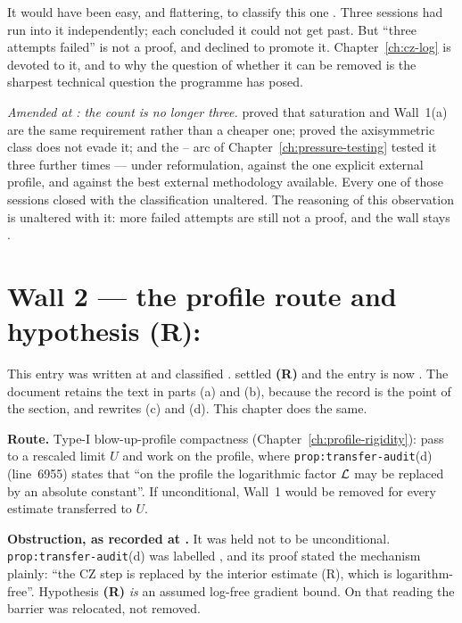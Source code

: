 \begin{obsv}
\label{obs:wall1-open}
It would have been easy, and flattering, to classify this one \IMPOSSIBLE{}.
Three sessions had run into it independently; each concluded it could not get
past. But ``three attempts failed'' is not a proof, and  declined to
promote it. Chapter~\ref{ch:cz-log} is devoted to it, and to why the question
of whether it can be removed is the sharpest technical question the programme
has posed.

\smallskip
\emph{Amended at : the count is no longer three.}  proved that
saturation and Wall~1(a) are the same requirement rather than a cheaper one;
 proved the axisymmetric class does not evade it; and the
-- arc of Chapter~\ref{ch:pressure-testing} tested it three
further times --- under reformulation, against the one explicit external
profile, and against the best external methodology available. Every one of
those sessions closed with the classification unaltered. The reasoning of this
observation is unaltered with it: more failed attempts are still not a proof,
and the wall stays \OPEN{}.
\end{obsv}

\section{Wall 2 --- the profile route and hypothesis (R): \texorpdfstring{\WITHDRAWN}{withdrawn}}
\label{sec:wall2}

This entry was written at  and classified \OPEN{}.  settled
\textbf{(R)} and the entry is now \WITHDRAWN{}. The document retains the 
text in parts (a) and (b), because the record is the point of the section, and
rewrites (c) and (d). This chapter does the same.

\textbf{Route.} Type-I blow-up-profile compactness
(Chapter~\ref{ch:profile-rigidity}): pass to a rescaled limit \(U\) and work on
the profile, where \texttt{prop:transfer-audit}(d) (line~6955) states that ``on
the profile the logarithmic factor \(\mathcal{L}\) may be replaced by an absolute
constant''. If unconditional, Wall~1 would be removed for every estimate
transferred to \(U\).

\textbf{Obstruction, as recorded at .} It was held not to be
unconditional. \texttt{prop:transfer-audit}(d) was labelled
, and its proof stated the mechanism plainly: ``the CZ step is
replaced by the interior estimate (R), which is logarithm-free''. Hypothesis
\textbf{(R)} \emph{is} an assumed log-free gradient bound. On that reading the
barrier was relocated, not removed.

